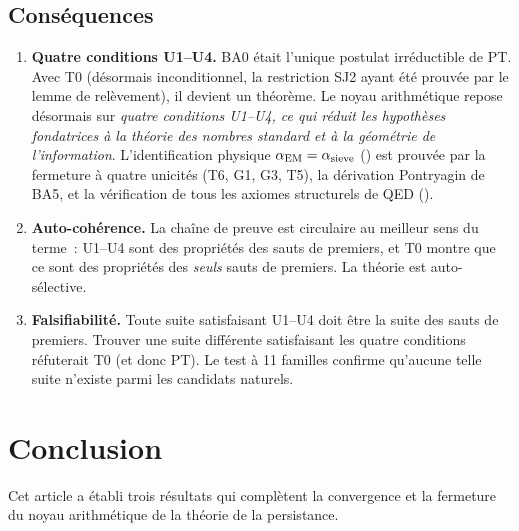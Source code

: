 \documentclass[12pt,a4paper]{article}
\begin{document}
\subsection{Conséquences}
\label{sec:ch25_consequences}

\begin{enumerate}
\item \textbf{Quatre conditions U1--U4.} BA0 était l'unique
  postulat irréductible de PT. Avec T0 (désormais inconditionnel,
  la restriction SJ2 ayant été prouvée par le lemme de relèvement),
  il devient un théorème. Le noyau arithmétique repose désormais
  sur \emph{quatre conditions U1--U4, ce qui réduit les hypothèses
  fondatrices à la théorie des nombres standard et à la géométrie
  de l'information}. L'identification physique
  $\alpha_{\mathrm{EM}} = \alpha_{\rm sieve}$ (\cite{companion_M5}) est
  prouvée par la fermeture à quatre unicités (T6, G1, G3, T5), la
  dérivation Pontryagin de BA5, et la vérification de tous les
  axiomes structurels de QED (\cite{companion_physics}).

\item \textbf{Auto-cohérence.} La chaîne de preuve est circulaire
  au meilleur sens du terme~: U1--U4 sont des propriétés des sauts
  de premiers, et T0 montre que ce sont des propriétés des
  \emph{seuls} sauts de premiers. La théorie est auto-sélective.

\item \textbf{Falsifiabilité.} Toute suite satisfaisant U1--U4 doit
  être la suite des sauts de premiers. Trouver une suite différente
  satisfaisant les quatre conditions réfuterait T0 (et donc PT). Le
  test à 11 familles confirme qu'aucune telle suite n'existe parmi
  les candidats naturels.
\end{enumerate}


\newpage

\section{Conclusion}
\label{sec:conclusion}

Cet article a établi trois résultats qui complètent la convergence
et la fermeture du noyau arithmétique de la théorie de la
persistance.
\end{document}
